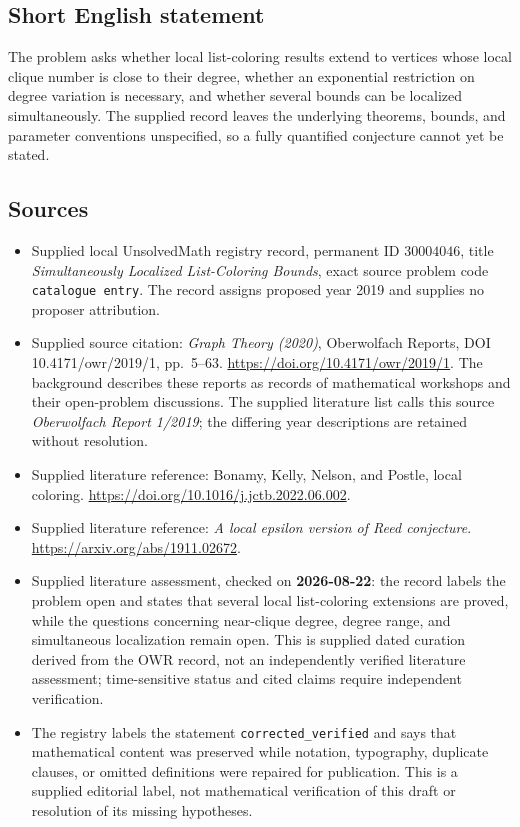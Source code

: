 \documentclass[11pt]{article}
\begin{document}
\subsection{Short English statement}
The problem asks whether local list-coloring results extend to vertices whose local clique number is close to their degree, whether an exponential restriction on degree variation is necessary, and whether several bounds can be localized simultaneously. The supplied record leaves the underlying theorems, bounds, and parameter conventions unspecified, so a fully quantified conjecture cannot yet be stated.
\subsection{Sources}
\begin{itemize}
\item Supplied local UnsolvedMath registry record, permanent ID \(30004046\), title \emph{Simultaneously Localized List-Coloring Bounds}, exact source problem code \texttt{catalogue entry}. The record assigns proposed year 2019 and supplies no proposer attribution.
\item Supplied source citation: \emph{Graph Theory (2020)}, Oberwolfach Reports, DOI 10.4171/owr/2019/1, pp.~5--63. \url{https://doi.org/10.4171/owr/2019/1}. The background describes these reports as records of mathematical workshops and their open-problem discussions. The supplied literature list calls this source \emph{Oberwolfach Report 1/2019}; the differing year descriptions are retained without resolution.
\item Supplied literature reference: Bonamy, Kelly, Nelson, and Postle, local coloring. \url{https://doi.org/10.1016/j.jctb.2022.06.002}.
\item Supplied literature reference: \emph{A local epsilon version of Reed conjecture}. \url{https://arxiv.org/abs/1911.02672}.
\item Supplied literature assessment, checked on \textbf{2026-08-22}: the record labels the problem open and states that several local list-coloring extensions are proved, while the questions concerning near-clique degree, degree range, and simultaneous localization remain open. This is supplied dated curation derived from the OWR record, not an independently verified literature assessment; time-sensitive status and cited claims require independent verification.
\item The registry labels the statement \texttt{corrected\_verified} and says that mathematical content was preserved while notation, typography, duplicate clauses, or omitted definitions were repaired for publication. This is a supplied editorial label, not mathematical verification of this draft or resolution of its missing hypotheses.
\end{itemize}
\end{document}
